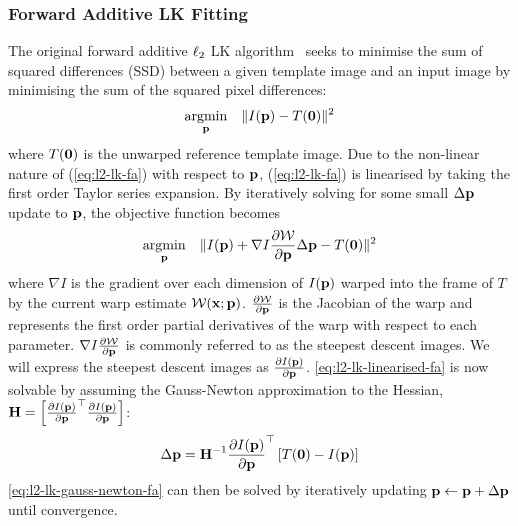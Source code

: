 \subsubsection{Forward Additive LK Fitting}\label{subsubsec:lk-fa}
The original forward additive $\ell_2$ LK
algorithm~\cite{RefWorks:71,RefWorks:10} seeks to minimise the sum of squared
differences (SSD) between a given template image and an input image by
minimising the sum of the squared pixel differences:
\begin{equation}\label{eq:l2-lk-fa}
    \argmin_{\p} \quad \norm{I(\p) - T(\zero)}^2
\end{equation}
where $T(\boldsymbol{\mathbf{0}})$ is the unwarped reference template image. Due to the non-linear
nature of (\ref{eq:l2-lk-fa}) with respect to $\boldsymbol{\mathbf{p}}$, (\ref{eq:l2-lk-fa}) is
linearised by taking the first order Taylor series expansion. By iteratively
solving for some small $\Delta \boldsymbol{\mathbf{p}}$ update to $\boldsymbol{\mathbf{p}}$, the objective function
becomes
\begin{equation}\label{eq:l2-lk-linearised-fa}
    \argmin_{\p} \quad \norm{I(\p) + \nabla I \frac{\partial \mathcal{W}}{\partial \p} \Delta \p - T(\zero)}^2
\end{equation}
where $\nabla I$ is the gradient over each dimension of $I(\boldsymbol{\mathbf{p}})$ warped into the
frame of $T$ by the current warp estimate $\mathcal{W}(\boldsymbol{\mathbf{x}};\boldsymbol{\mathbf{p}})$.
$\frac{\partial \mathcal{W}}{\partial \boldsymbol{\mathbf{p}}}$ is the Jacobian of the warp and
represents the first order partial derivatives of the warp with respect to each
parameter. $\nabla I \frac{\partial \mathcal{W}}{\partial \boldsymbol{\mathbf{p}}}$ is commonly
referred to as the steepest descent images. We will express the steepest descent
images as $\frac{\partial I(\boldsymbol{\mathbf{p}})}{\partial \boldsymbol{\mathbf{p}}}$. 
\cref{eq:l2-lk-linearised-fa} is now solvable by assuming the 
Gauss-Newton approximation to the Hessian,
$\boldsymbol{\mathbf{H}} = \left[ {\frac{\partial I(\boldsymbol{\mathbf{p}})}{\partial \boldsymbol{\mathbf{p}}}}^{\top} \frac{\partial I(\boldsymbol{\mathbf{p}})}{\partial \boldsymbol{\mathbf{p}}} \right]$:
\begin{equation}\label{eq:l2-lk-gauss-newton-fa}
    \Delta \boldsymbol{\mathbf{p}} = \boldsymbol{\mathbf{H}}^{-1} \frac{\partial I(\boldsymbol{\mathbf{p}})}{\partial \boldsymbol{\mathbf{p}}}^{\top} \left[ T(\boldsymbol{\mathbf{0}}) - I(\boldsymbol{\mathbf{p}}) \right]
\end{equation}
\cref{eq:l2-lk-gauss-newton-fa} can then be solved by iteratively
updating $\boldsymbol{\mathbf{p}} \leftarrow \boldsymbol{\mathbf{p}} + \Delta \boldsymbol{\mathbf{p}}$ until convergence.
